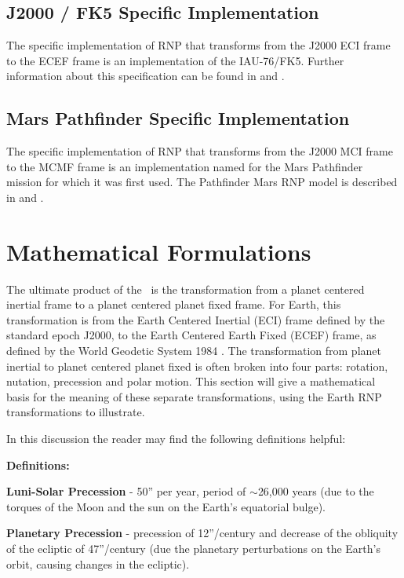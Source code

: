 \subsection{J2000 / FK5 Specific Implementation}

The specific implementation of RNP that transforms from the J2000 ECI frame
to the ECEF frame is an implementation of the IAU-76/FK5. Further information
about this specification can be found in \cite{Bond1} and \cite{ValladoThird}.

\subsection{Mars Pathfinder Specific Implementation}

The specific implementation of RNP that transforms from the J2000 MCI frame
to the MCMF frame is an implementation named for the Mars Pathfinder mission
for which it was first used. The Pathfinder Mars RNP model is described in
\cite{Konopliv06} and \cite{Konopliv10}.

\section{Mathematical Formulations}

The ultimate product of the \ModelDesc\ is the transformation from a
planet centered inertial frame to a planet centered planet fixed frame. For
Earth, this transformation is from the Earth Centered Inertial (ECI) frame
defined by the standard epoch J2000, to the Earth Centered Earth Fixed (ECEF)
frame, as defined by the World Geodetic System 1984 \cite{WGS84}. The
transformation from planet inertial to planet centered planet fixed is often
broken into four parts: rotation, nutation, precession and polar motion. This
section will give a mathematical basis for the meaning of these separate
transformations, using the Earth RNP transformations to illustrate.

In this discussion the reader may find the following definitions
helpful:

\textbf{Definitions:}

\textbf{Luni-Solar Precession} - 50'' per year, period of $\sim $26,000
years (due to the torques of the Moon and the sun on
the Earth's equatorial bulge).

\textbf{Planetary Precession} - precession of 12''/century and
decrease of the obliquity of the ecliptic of 47''/century
(due the planetary perturbations on the Earth's orbit,
causing changes in the ecliptic).

